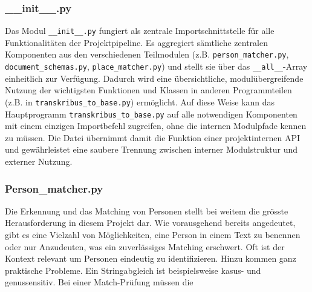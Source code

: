 \documentclass[12pt, a4paper, ngerman, bidi=default]{article}
\newcommand{\code}[1]{\colorbox{VeryLightGray}{\texttt{#1}}} %
\begin{document}
\subsubsection{\_\_init\_\_.py}\label{subsec:init_module}
Das Modul \code{\_\_init\_\_.py} fungiert als zentrale Importschnittstelle für alle Funktionalitäten der Projektpipeline. Es aggregiert sämtliche zentralen Komponenten aus den verschiedenen Teilmodulen (z.B. \code{person\_matcher.py}, \code{document\_schemas.py}, \code{place\_matcher.py}) und stellt sie über das \code{\_\_all\_\_}-Array einheitlich zur Verfügung. Dadurch wird eine übersichtliche, modulübergreifende Nutzung der wichtigsten Funktionen und Klassen in anderen Programmteilen (z.B. in \code{transkribus\_to\_base.py}) ermöglicht.
Auf diese Weise kann das Hauptprogramm \code{transkribus\_to\_base.py} auf alle notwendigen Komponenten mit einem einzigen Importbefehl zugreifen, ohne die internen Modulpfade kennen zu müssen. Die Datei übernimmt damit die Funktion einer projektinternen API und gewährleistet eine saubere Trennung zwischen interner Modulstruktur und externer Nutzung. 
\newpage
\begin{minipage}[t]{0.35\textwidth}
  \justifying%

  \subsubsection{Person\_matcher.py}\label{subsec:person_matcher.py}

  Die Erkennung und das Matching von Personen stellt bei weitem die grösste Herausforderung in diesem Projekt dar. Wie vorausgehend bereits angedeutet, gibt es eine Vielzahl von Möglichkeiten, eine Person in einem Text zu benennen oder nur Anzudeuten, was ein zuverlässiges Matching erschwert. Oft ist der Kontext relevant um Personen eindeutig zu identifizieren. Hinzu kommen ganz praktische Probleme. Ein Stringabgleich ist beispielsweise kasus- und genussensitiv. Bei einer Match-Prüfung müssen die   \end{minipage}
  
\end{document}
